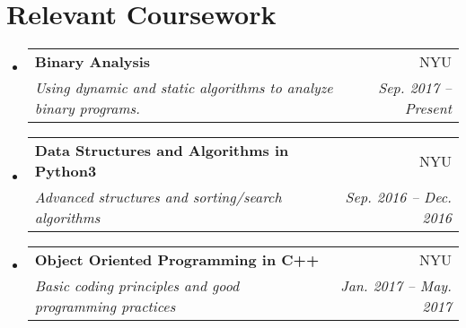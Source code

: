 \documentclass[letterpaper,10pt]{article}
\makeatletter
\newcommand{\resumeSubheading}[4]{
  \vspace{-3pt}\item
    \begin{tabular*}{0.97\textwidth}{l@{\extracolsep{\fill}}r}
      \textbf{#1} & #2 \\
      \textit{\small#3} & \textit{\small #4} \\
    \end{tabular*}\vspace{-5pt}
}
\newcommand{\resumeSubHeadingListStart}{\begin{itemize}[leftmargin=*]}
\newcommand{\resumeSubHeadingListEnd}{\end{itemize}}
\makeatother
\begin{document}
\section{Relevant Coursework}
  \resumeSubHeadingListStart
    \resumeSubheading
      {Binary Analysis}{NYU}
      {Using dynamic and static algorithms to analyze binary programs.}{Sep. 2017 -- Present}
    \resumeSubheading
      {Data Structures and Algorithms in Python3}{NYU}
      {Advanced structures and sorting/search algorithms}{Sep. 2016 -- Dec. 2016}
    \resumeSubheading
      {Object Oriented Programming in C++}{NYU}
      {Basic coding principles and good programming practices}{Jan. 2017 -- May. 2017}
  \resumeSubHeadingListEnd
\end{document}
